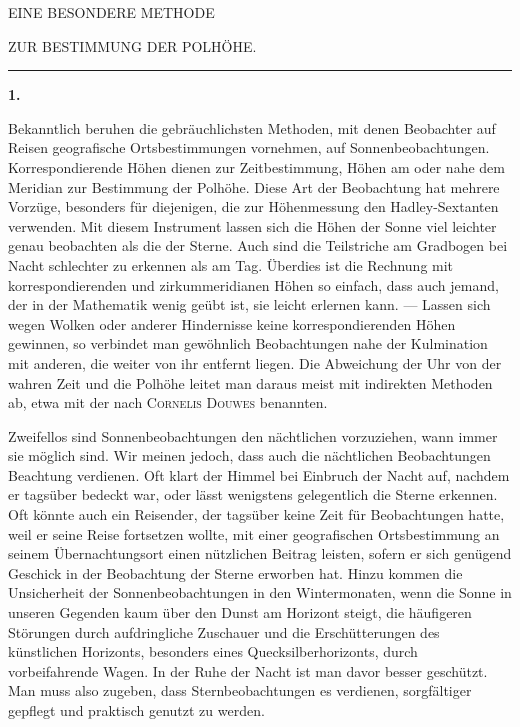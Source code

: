 \renewcommand{\Article}[1]{\par\medskip\Needspace{5\baselineskip}\pdfbookmark[1]{Art. #1}{poli1808-art-#1}\begin{center}\textbf{#1.}\end{center}\nobreak}
\begin{center}\large EINE BESONDERE METHODE\par\medskip
ZUR BESTIMMUNG DER POLHÖHE.\par\medskip\rule{.09\linewidth}{.3pt}\end{center}
\Article{1}
Bekanntlich beruhen die gebräuchlichsten Methoden, mit denen Beobachter auf Reisen geografische Ortsbestimmungen vornehmen, auf Sonnenbeobachtungen. Korrespondierende Höhen dienen zur Zeitbestimmung, Höhen am oder nahe dem Meridian zur Bestimmung der Polhöhe. Diese Art der Beobachtung hat mehrere Vorzüge, besonders für diejenigen, die zur Höhenmessung den Hadley-Sextanten verwenden. Mit diesem Instrument lassen sich die Höhen der Sonne viel leichter genau beobachten als die der Sterne. Auch sind die Teilstriche am Gradbogen bei Nacht schlechter zu erkennen als am Tag. Überdies ist die Rechnung mit korrespondierenden und zirkummeridianen Höhen so einfach, dass auch jemand, der in der Mathematik wenig geübt ist, sie leicht erlernen kann. --- Lassen sich wegen Wolken oder anderer Hindernisse keine korrespondierenden Höhen gewinnen, so verbindet man gewöhnlich Beobachtungen nahe der Kulmination mit anderen, die weiter von ihr entfernt liegen. Die Abweichung der Uhr von der wahren Zeit und die Polhöhe leitet man daraus meist mit indirekten Methoden ab, etwa mit der nach \textsc{Cornelis Douwes} benannten.

Zweifellos sind Sonnenbeobachtungen den nächtlichen vorzuziehen, wann immer sie möglich sind. Wir meinen jedoch, dass auch die nächtlichen Beobachtungen Beachtung verdienen. Oft klart der Himmel bei Einbruch der Nacht auf, nachdem er tagsüber bedeckt war, oder lässt wenigstens gelegentlich
die Sterne erkennen. Oft könnte auch ein Reisender, der tagsüber keine Zeit für Beobachtungen hatte, weil er seine Reise fortsetzen wollte, mit einer geografischen Ortsbestimmung an seinem Übernachtungsort einen nützlichen Beitrag leisten, sofern er sich genügend Geschick in der Beobachtung der Sterne erworben hat. Hinzu kommen die Unsicherheit der Sonnenbeobachtungen in den Wintermonaten, wenn die Sonne in unseren Gegenden kaum über den Dunst am Horizont steigt, die häufigeren Störungen durch aufdringliche Zuschauer und die Erschütterungen des künstlichen Horizonts, besonders eines Quecksilberhorizonts, durch vorbeifahrende Wagen. In der Ruhe der Nacht ist man davor besser geschützt. Man muss also zugeben, dass Sternbeobachtungen es verdienen, sorgfältiger gepflegt und praktisch genutzt zu werden.


